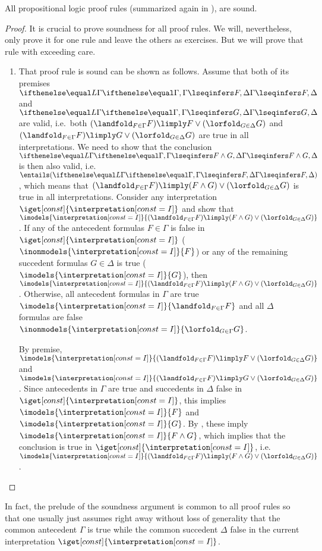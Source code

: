 \documentclass[11pt,twoside]{scrartcl}
\newcommand{\I}{\interpretation[const=I]}
\newcommand{\asfml}{F}
\newcommand{\bsfml}{G}
\begin{document}
\begin{lemma} \label{lem:sound-proof-rule}
All propositional logic proof rules (summarized again in ), are sound.
\end{lemma}
\begin{proof}
It is crucial to prove soundness for all proof rules.
We will, nevertheless, only prove it for one rule and leave the others as exercises.
But we will prove that rule with exceeding care.
\begin{enumerate}
\item[\irref{andr}] That proof rule  is sound can be shown as follows.
Assume that both of its premises \(\lsequent{\Gamma}{\asfml,\Delta}\) and \(\lsequent{\Gamma}{\bsfml,\Delta}\) are valid, i.e.\ both 
\((\landfold_{F\in\Gamma} F) \limply \asfml\lor(\lorfold_{G\in\Delta} G)\)
and \((\landfold_{F\in\Gamma} F) \limply \bsfml\lor(\lorfold_{G\in\Delta} G)\)
are true in all interpretations.
We need to show that the conclusion \(\lsequent{\Gamma}{\asfml\land\bsfml,\Delta}\) is then also valid, i.e.\ \(\entails (\lsequent{\Gamma}{\asfml,\Delta})\), which means that \((\landfold_{F\in\Gamma} F) \limply (\asfml\land\bsfml)\lor(\lorfold_{G\in\Delta} G)\) is true in all interpretations.
Consider any interpretation $\iget[const]{\I}$ and show that 
\(\imodels{\I}{(\landfold_{F\in\Gamma} F) \limply (\asfml\land\bsfml)\lor(\lorfold_{G\in\Delta} G)}\).
If any of the antecedent formulas $F\in\Gamma$ is false in $\iget[const]{\I}$ (\(\inonmodels{\I}{F}\)) or any of the remaining succedent formulas $G\in\Delta$ is true (\(\imodels{\I}{G}\)), 
then 
\(\imodels{\I}{(\landfold_{F\in\Gamma} F) \limply (\asfml\land\bsfml)\lor(\lorfold_{G\in\Delta} G)}\).
Otherwise, all antecedent formulas in $\Gamma$ are true \(\imodels{\I}{\landfold_{F\in\Gamma} F}\) and all $\Delta$ formulas are false \(\inonmodels{\I}{\lorfold_{G\in\Gamma} G}\).

By premise, 
\(\imodels{\I}{(\landfold_{F\in\Gamma} F) \limply \asfml\lor(\lorfold_{G\in\Delta} G)}\)
and
\(\imodels{\I}{(\landfold_{F\in\Gamma} F) \limply \bsfml\lor(\lorfold_{G\in\Delta} G)}\).
Since antecedents in $\Gamma$ are true and succedents in $\Delta$ false in $\iget[const]{\I}$, this implies
\(\imodels{\I}{\asfml}\) and \(\imodels{\I}{\bsfml}\).
By , these imply
\(\imodels{\I}{\asfml\land\bsfml}\), which implies that the conclusion is true in $\iget[const]{\I}$, i.e.\
\(\imodels{\I}{(\landfold_{F\in\Gamma} F) \limply (\asfml\land\bsfml)\lor(\lorfold_{G\in\Delta} G)}\).
\qedhere
\end{enumerate}
\end{proof}
In fact, the prelude of the soundness argument is common to all proof rules so that one usually just assumes right away without loss of generality that the common antecedent $\Gamma$ is true while the common succedent $\Delta$ false in the current interpretation $\iget[const]{\I}$.
\end{document}
